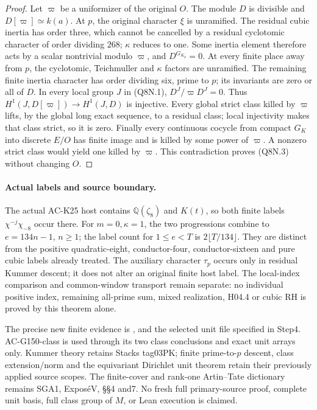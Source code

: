 \begin{proof}
Let $\varpi$ be a uniformizer of the original $O$.
The module $D$ is divisible and $D[\varpi]\simeq k(a)$.
At $p$, the original character $\xi$ is unramified.
The residual cubic inertia has order three, which cannot be
cancelled by a residual cyclotomic character of order dividing
$268$; $\kappa$ reduces to one.
Some inertia element therefore acts by a scalar nontrivial
modulo $\varpi$, and $D^{G_{K_p}}=0$.
At every finite place away from $p$, the cyclotomic,
Teichmuller and $\kappa$ factors are unramified.
The remaining finite inertia character has order dividing six,
prime to $p$; its invariants are zero or all of $D$.
In every local group $J$ in (Q8N.1),
$D^J/\varpi D^J=0$.
Thus $H^1(J,D[\varpi])\to H^1(J,D)$ is injective.
Every global strict class killed by $\varpi$ lifts, by the global
long exact sequence, to a residual class; local injectivity
makes that class strict, so it is zero.
Finally every continuous cocycle from compact $G_K$ into discrete
$E/O$ has finite image and is killed by some power of $\varpi$.
A nonzero strict class would yield one killed by $\varpi$.
This contradiction proves (Q8N.3) without changing $O$.
\end{proof}

\paragraph{Actual labels and source boundary.}
The actual AC-K25 host contains $\mathbb Q(\zeta_8)$ and $K(t)$,
so both finite labels $\chi^{-j}\chi_{-8}$ occur there.
For $m=0,\kappa=1$, the two progressions combine to
$e=134n-1$, $n\geq1$; the label count for $1\leq e<T$ is
$2\lfloor T/134\rfloor$.
They are distinct from the positive quadratic-eight, conductor-four,
conductor-sixteen and pure cubic labels already treated.
The auxiliary character $\tau_p$ occurs only in residual Kummer
descent; it does not alter an original finite host label.
The local-index comparison and common-window transport remain
separate: no individual positive index, remaining all-prime sum,
mixed realization, H04.4 or cubic RH is proved by this theorem alone.

The precise new finite evidence is
,
 and the selected unit file
specified in Step4.  AC-G150-class is used through its two class
conclusions and exact unit arrays only.
Kummer theory retains Stacks tag03PK; finite prime-to-$p$ descent,
class extension/norm and the equivariant Dirichlet unit theorem
retain their previously applied source scopes.
The finite-cover and rank-one Artin--Tate dictionary remains
SGA1, Expos\'eV, \S\S4 and7.
No fresh full primary-source proof, complete unit basis, full
class group of $M$, or Lean execution is claimed.
